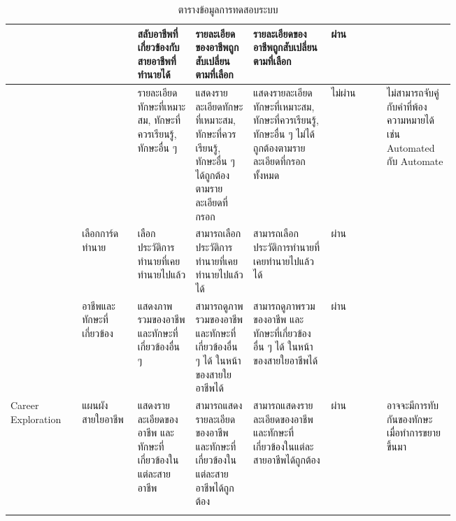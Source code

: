 \begin{longtable}{>{\centering}p{0.1\linewidth}|p{0.1\linewidth}|p{0.1\linewidth}|p{0.1\linewidth}|p{0.14\linewidth}|>{\centering}p{0.1\linewidth}|p{0.1\linewidth}}
                       &                                  & สลับอาชีพที่เกี่ยวข้องกับสายอาชีพที่ทำนายได้                   & รายละเอียดของอาชีพถูกสับเปลี่ยนตามที่เลือก                                           & รายละเอียดของอาชีพถูกสับเปลี่ยนตามที่เลือก                                                  & ผ่าน      &                                                        \\ \cline{3-7}
                       &                                  & รายละเอียดทักษะที่เหมาะสม, ทักษะที่ควรเรียนรู้, ทักษะอื่น ๆ    & แสดงรายละเอียดทักษะที่เหมาะสม, ทักษะที่ควรเรียนรู้, ทักษะอื่น ๆ ได้ถูกต้องตามรายละเอียดที่กรอก & แสดงรายละเอียดทักษะที่เหมาะสม, ทักษะที่ควรเรียนรู้, ทักษะอื่น ๆ ไม่ได้ถูกต้องตามรายละเอียดที่กรอกทั้งหมด & ไม่ผ่าน    & ไม่สามารถจับคู่กับคำที่พ้องความหมายได้ เช่น Automated กับ Automate \\
    \cline{2-7}
                       & เลือกการ์ดทำนาย                     & เลือกประวัติการทำนายที่เคยทำนายไปแล้ว                     & สามารถเลือกประวัติการทำนายที่เคยทำนายไปแล้วได้                                       & สามารถเลือกประวัติการทำนายที่เคยทำนายไปแล้วได้                                              & ผ่าน      &                                                        \\
    \cline{2-7}
                       & อาชีพและทักษะที่เกี่ยวข้อง              & แสดงภาพรวมของอาชีพ และทักษะที่เกี่ยวข้องอื่น ๆ             & สามารถดูภาพรวมของอาชีพ และทักษะที่เกี่ยวข้องอื่น ๆ ได้ ในหน้าของสายใยอาชีพได้             & สามารถดูภาพรวมของอาชีพ และทักษะที่เกี่ยวข้องอื่น ๆ ได้ ในหน้าของสายใยอาชีพได้                    & ผ่าน      &                                                        \\ \hline
    Career Exploration & แผนผังสายใยอาชีพ                   & แสดงรายละเอียดของอาชีพ และทักษะที่เกี่ยวข้องในแต่ละสายอาชีพ & สามารถแสดงรายละเอียดของอาชีพ และทักษะที่เกี่ยวข้องในแต่ละสายอาชีพได้ถูกต้อง              & สามารถแสดงรายละเอียดของอาชีพ และทักษะที่เกี่ยวข้องในแต่ละสายอาชีพได้ถูกต้อง                     & ผ่าน      & อาจจะมีการทับกันของทักษะ เมื่อทำการขยายขึ้นมา                   \\
    \caption{ตารางข้อมูลการทดสอบระบบ}
    \label{tbl:test-scenario}
\end{longtable}
